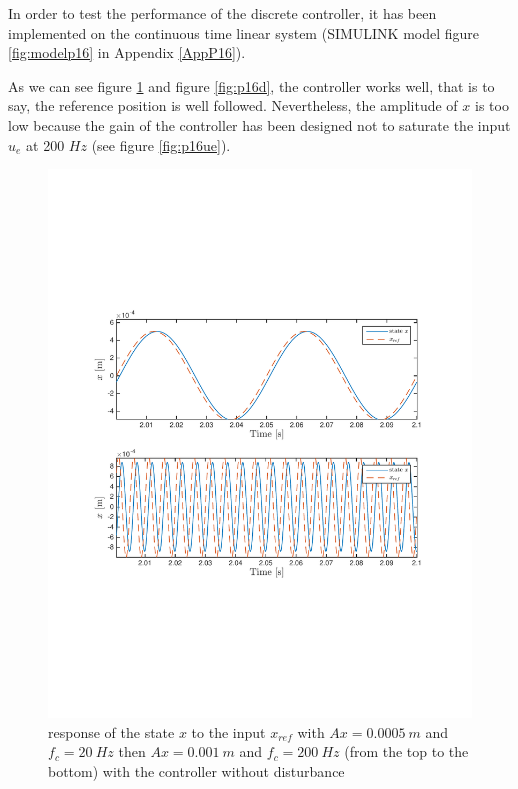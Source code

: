 In order to test the performance of the discrete controller, it has been implemented on the continuous time linear system (SIMULINK model figure \ref{fig:modelp16} in Appendix \ref{AppP16}).

As we can see figure \ref{fig:p16d0} and figure \ref{fig:p16d}, the controller works well, that is to say, the reference position is well followed. Nevertheless, the amplitude of $x$ is too low because the gain of the controller has been designed not to saturate the input $u_e$ at 200 $Hz$ (see figure \ref{fig:p16ue}).

\begin{figure}[H]
 \centering 
 \includegraphics[trim=2cm 7cm 2cm 7cm, clip=true, totalheight=0.35\textheight, angle=0]{figures/p16d0.pdf}
 \caption{response of the state $x$ to the input $x_{ref}$ with $Ax = 0.0005\ m$ and $f_c = 20\ Hz$ then $Ax = 0.001\ m$ and $f_c = 200\ Hz$ (from the top to the bottom) with the controller without disturbance}
 \label{fig:p16d0}
\end{figure}

